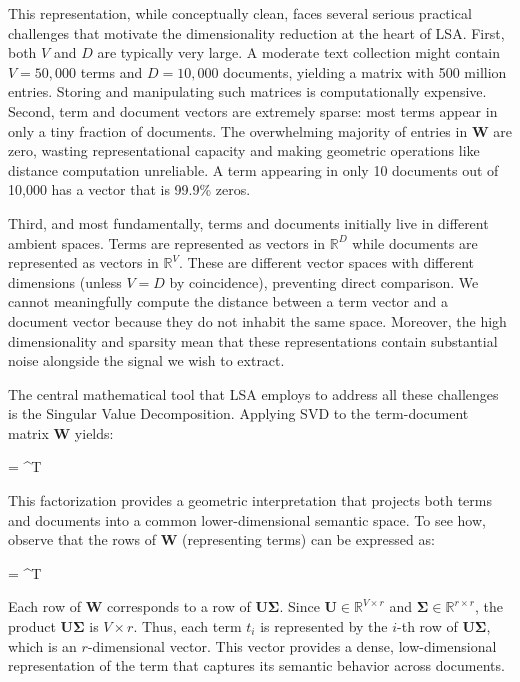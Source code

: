 This representation, while conceptually clean, faces several serious practical challenges that motivate the dimensionality reduction at the heart of LSA. First, both $V$ and $D$ are typically very large. A moderate text collection might contain $V = 50{,}000$ terms and $D = 10{,}000$ documents, yielding a matrix with 500 million entries. Storing and manipulating such matrices is computationally expensive. Second, term and document vectors are extremely sparse: most terms appear in only a tiny fraction of documents. The overwhelming majority of entries in $\mathbf{W}$ are zero, wasting representational capacity and making geometric operations like distance computation unreliable. A term appearing in only 10 documents out of 10,000 has a vector that is 99.9\% zeros.

Third, and most fundamentally, terms and documents initially live in different ambient spaces. Terms are represented as vectors in $\mathbb{R}^D$ while documents are represented as vectors in $\mathbb{R}^V$. These are different vector spaces with different dimensions (unless $V = D$ by coincidence), preventing direct comparison. We cannot meaningfully compute the distance between a term vector and a document vector because they do not inhabit the same space. Moreover, the high dimensionality and sparsity mean that these representations contain substantial noise alongside the signal we wish to extract.

The central mathematical tool that LSA employs to address all these challenges is the Singular Value Decomposition. Applying SVD to the term-document matrix $\mathbf{W}$ yields:
\begin{myequation}
 =  \boldsymbol{\Sigma} ^T
\end{myequation}

This factorization provides a geometric interpretation that projects both terms and documents into a common lower-dimensional semantic space. To see how, observe that the rows of $\mathbf{W}$ (representing terms) can be expressed as:
\begin{myequation}
 =  \boldsymbol{\Sigma} ^T
\end{myequation}

Each row of $\mathbf{W}$ corresponds to a row of $\mathbf{U}\boldsymbol{\Sigma}$. Since $\mathbf{U} \in \mathbb{R}^{V \times r}$ and $\boldsymbol{\Sigma} \in \mathbb{R}^{r \times r}$, the product $\mathbf{U}\boldsymbol{\Sigma}$ is $V \times r$. Thus, each term $t_i$ is represented by the $i$-th row of $\mathbf{U}\boldsymbol{\Sigma}$, which is an $r$-dimensional vector. This vector provides a dense, low-dimensional representation of the term that captures its semantic behavior across documents.

